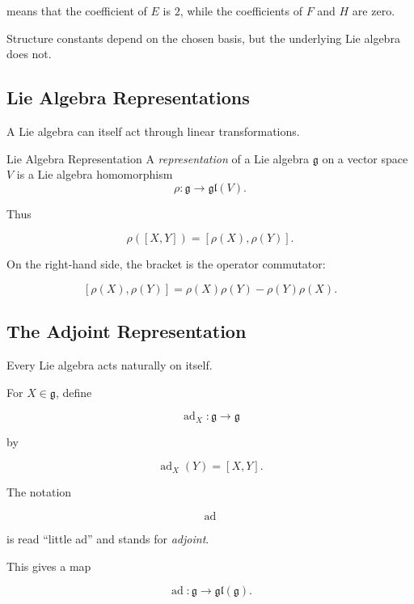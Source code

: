means that the coefficient of \(E\) is \(2\), while the coefficients of
\(F\) and \(H\) are zero.

Structure constants depend on the chosen basis, but the underlying Lie
algebra does not.

\subsection{Lie Algebra Representations}
\label{subsec:lie-algebra-representations}

A Lie algebra can itself act through linear transformations.

\begin{definitionbox}{Lie Algebra Representation}
A \emph{representation} of a Lie algebra \(\mathfrak g\) on a vector space
\(V\) is a Lie algebra homomorphism
\[ \rho:\mathfrak g\to\mathfrak{gl}(V). \]
\end{definitionbox}

Thus

\[ \rho([X,Y])=[\rho(X),\rho(Y)]. \]

On the right-hand side, the bracket is the operator commutator:

\[ [\rho(X),\rho(Y)]
=\rho(X)\rho(Y)-\rho(Y)\rho(X). \]

\subsection{The Adjoint Representation}
\label{subsec:adjoint-representation}

Every Lie algebra acts naturally on itself.

For \(X\in\mathfrak g\), define

\[ \operatorname{ad}_X:\mathfrak g\to\mathfrak g \]

by

\[ \operatorname{ad}_X(Y)=[X,Y]. \]

The notation

\[ \operatorname{ad} \]

is read ``little ad'' and stands for \emph{adjoint}.

This gives a map

\[ \operatorname{ad}:\mathfrak g\to\mathfrak{gl}(\mathfrak g). \]

